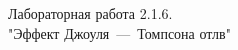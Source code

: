 \documentclass[12pt,a4paper,fleqn]{article}
\begin{document}
    \begin{center}
        Лабораторная работа 2.1.6.
        \\
        "Эффект Джоуля~---~Томпсона отлв"
        \\
    \end{center}
\end{document}
